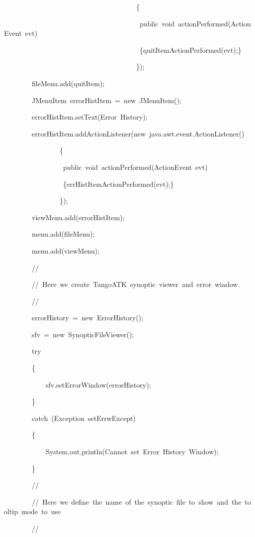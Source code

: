 \begin{lyxcode}
~~~~~~~~~~~~~~~~~~~~~~~~~~~~~~~~~~~~~~\{~~~~~~~~~~~~~~~~~

~~~~~~~~~~~~~~~~~~~~~~~~~~~~~~~~~~~~~~~public~void~actionPerformed(ActionEvent~evt)

~~~~~~~~~~~~~~~~~~~~~~~~~~~~~~~~~~~~~~~\{quitItemActionPerformed(evt);\}

~~~~~~~~~~~~~~~~~~~~~~~~~~~~~~~~~~~~~~\});

~~~~~~~~fileMenu.add(quitItem);

~~~~~~~~JMenuItem~errorHistItem~=~new~JMenuItem();

~~~~~~~~errorHistItem.setText(\textquotedbl{}Error~History\textquotedbl{});

~~~~~~~~errorHistItem.addActionListener(new~java.awt.event.ActionListener()

~~~~~~~~~~~~~~~~\{~~~~~~~~~~~~~~~~~

~~~~~~~~~~~~~~~~~public~void~actionPerformed(ActionEvent~evt)

~~~~~~~~~~~~~~~~~\{errHistItemActionPerformed(evt);\}

~~~~~~~~~~~~~~~~\});

~~~~~~~~viewMenu.add(errorHistItem);

~~~~~~~~menu.add(fileMenu);

~~~~~~~~menu.add(viewMenu);

~~~~~~~~//

~~~~~~~~//~Here~we~create~TangoATK~synoptic~viewer~and~error~window.

~~~~~~~~//

~~~~~~~~errorHistory~=~new~ErrorHistory();

~~~~~~~~sfv~=~new~SynopticFileViewer();

~~~~~~~~try

~~~~~~~~\{

~~~~~~~~~~~~sfv.setErrorWindow(errorHistory);

~~~~~~~~\}

~~~~~~~~catch~(Exception~setErrwExcept)

~~~~~~~~\{

~~~~~~~~~~~~System.out.println(\textquotedbl{}Cannot~set~Error~History~Window\textquotedbl{});

~~~~~~~~\}



~~~~~~~~//~~~~~~

~~~~~~~~//~Here~we~define~the~name~of~the~synoptic~file~to~show~and~the~tooltip~mode~to~use

~~~~~~~~//~~~~~~~~


\end{lyxcode}
